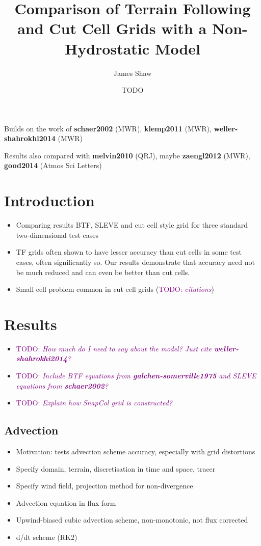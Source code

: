 \documentclass[a4paper]{article}
\title{Comparison of Terrain Following and Cut Cell Grids with a Non-Hydrostatic Model}
\author{James Shaw}
\date{TODO}
\begin{document}
\newcommand{\TODO}[1]{\textcolor{purple}{TODO: \emph{#1}}}
\newcommand{\textcite}[1]{\textbf{#1}}

\maketitle

Builds on the work of \textcite{schaer2002} (MWR), \textcite{klemp2011} (MWR), \textcite{weller-shahrokhi2014} (MWR)

Results also compared with \textcite{melvin2010} (QRJ), maybe \textcite{zaengl2012} (MWR), \textcite{good2014} (Atmos Sci Letters)

\section{Introduction}

\begin{itemize}
	\item Comparing results BTF, SLEVE and cut cell style grid for three standard two-dimensional test cases
	\item TF grids often shown to have lesser accuracy than cut cells in some test cases, often significantly so.  Our results demonstrate that accuracy need not be much reduced and can even be better than cut cells.
	\item Small cell problem common in cut cell grids (\TODO{citations})
\end{itemize}

\section{Results}
\begin{itemize}
	\item \TODO{How much do I need to say about the model?  Just cite \textcite{weller-shahrokhi2014}?}
	\item \TODO{Include BTF equations from \textcite{galchen-somerville1975} and SLEVE equations from \textcite{schaer2002}?}
	\item \TODO{Explain how SnapCol grid is constructed?}
\end{itemize}

\subsection{Advection}
\begin{itemize}
	\item Motivation: tests advection scheme accuracy, especially with grid distortions
	\item Specify domain, terrain, discretisation in time and space, tracer
	\item Specify wind field, projection method for non-divergence
	\item Advection equation in flux form
	\item Upwind-biased cubic advection scheme, non-monotonic, not flux corrected
	\item d/dt scheme (RK2)
\end{itemize}
\end{document}
